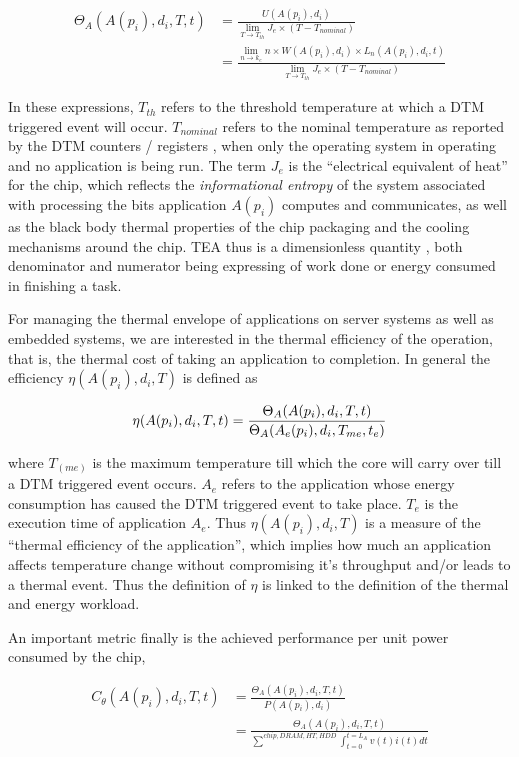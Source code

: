 \documentclass[]{sig-alternate-hotpower09}
\begin{document}
\begin{align}
\Theta_A(A(p_i),d_i, T, t) &= \frac{U(A(p_i),d_i)}{\displaystyle \lim_{T \to T_{th}} J_e \times (T - T_{nominal})}  \\
					      &= \frac{\displaystyle \lim_{n \to k_e }n \times W(A(p_i),d_i) \times L_n(A(p_i),d_i,t)}{\displaystyle \lim_{T \to T_{th}} J_e \times (T - T_{nominal})} 
\end{align}

In these expressions, $T_{th}$ refers to the threshold temperature at
which a DTM triggered event will occur.  $T_{nominal}$ refers to the
nominal temperature as reported by the DTM counters / registers , when
only the operating system in operating and no application is being run.
The term $J_e$ is the ``electrical equivalent of heat'' for the chip,
which reflects the \textit{informational entropy} of the system
associated with processing the bits application $A(p_i)$ computes and
communicates, as well as the black body thermal properties of the chip
packaging and the cooling mechanisms around the chip. TEA thus is a
dimensionless quantity , both denominator and numerator being expressing
of work done or energy consumed in finishing a task.

For managing the thermal envelope of applications on server systems as
well as embedded systems, we are interested in the thermal efficiency of
the operation, that is, the thermal cost of taking an application to
completion. In general the efficiency $\eta(A(p_i), d_i,T)$ is defined
as

\[
\eta(A(p_i), d_i,T, t) = \frac{\Theta_A(A(p_i),d_i, T, t)}{\Theta_A(A_e(p_i),d_i, T_{me}, t_e)} \\
\]

where $T_(me)$ is the maximum temperature till which the core will carry
over till a DTM triggered event occurs. $A_e$ refers to the application
whose energy consumption has caused the DTM triggered event to take
place. $T_e$ is the execution time of application $A_e$. Thus
$\eta(A(p_i), d_i,T)$ is a measure of the ``thermal efficiency of the
application'', which implies how much an application affects temperature
change without compromising it's throughput and/or leads to a thermal
event. Thus the definition of $\eta$ is linked to the definition of the
thermal and energy workload.

An important metric finally is the achieved performance per unit power
consumed by the chip,

\begin{align}
C_{\theta}(A(p_i), d_i, T, t) &= \frac{\Theta_A(A(p_i),d_i, T, t)}{P(A(p_i),d_i)} \\
	             			 &= \frac{\Theta_A(A(p_i),d_i, T, t)}{\displaystyle \sum^{chip,DRAM,HT,HDD} \int_{t=0}^{t=L_A}v(t)i(t)dt} 
\end{align}
\end{document}
